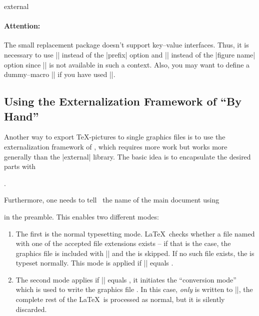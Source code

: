 {\begin{pgfplotslibrary}{external}
\paragraph{Attention:} The small replacement package doesn't support key--value interfaces. Thus, it is necessary to use || instead of the |prefix| option and || instead of the |figure name| option since |\tikzset| is not available in such a context. Also, you may want to define a dummy--macro |\pgfplotsset| if you have used |\pgfplotsset|.
\end{pgfplotslibrary}

\subsection[Using the Externalization Framework of PGF By Hand]{Using the Externalization Framework of {\normalfont\pgfname} ``By Hand''}
Another way to export \TeX-pictures to single graphics files is to use the externalization framework of \pgfname, which requires more work but works more generally than the |external| library.
The basic idea is to encapsulate the desired parts with

\declareandlabel{\beginpgfgraphicnamed}


\declareandlabel{\endpgfgraphicnamed}. 

\noindent Furthermore, one needs to tell \pgfname\ the name of the main document using

\declareandlabel{\pgfrealjobname}

\noindent in the preamble. This enables two different modes: 
\begin{enumerate}
	\item The first is the normal typesetting mode. \LaTeX\ checks whether a file named  with one of the accepted file extensions exists -- if that is the case, the graphics file is included with |\pgfimage| and the  is skipped. If no such file exists, the  is typeset normally. This mode is applied if |\jobname| equals .
	\item The second mode applies if |\jobname| equals , it initiates the ``conversion mode'' which is used to write the graphics file . In this case, \emph{only}  is written to |\jobname|, the complete rest of the \LaTeX\ is processed as normal, but it is silently discarded.


\end{enumerate}}
